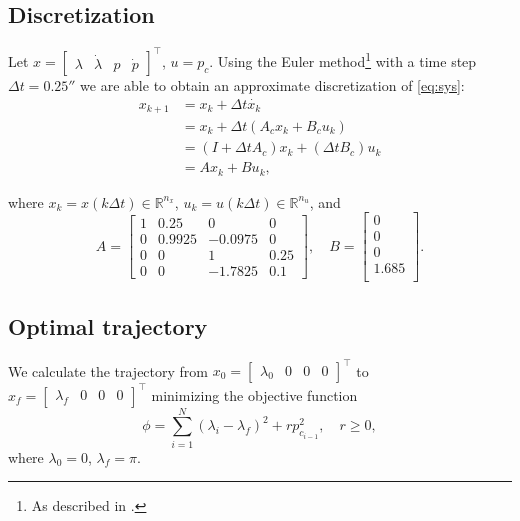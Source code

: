 \subsection{Discretization}
Let $x = \begin{bmatrix}\lambda&\dot{\lambda}&p&\dot{p}\end{bmatrix}^\top$, $u = p_c$. Using the Euler method\footnote{As described in \cite{Gravdahl2003}.} with a time step $\Delta t = 0.25\second$ we are able to obtain an approximate discretization of \eqref{eq:sys}:
\begin{align}
\label{eq:dmodel}
	x_{k+1} &= x_k + \Delta t \dot{x_k}\nonumber \\
			&= x_k + \Delta t (A_c x_k + B_c u_k)\nonumber\\
			&= (I + \Delta t A_c) x_k + (\Delta t B_c) u_k\nonumber \\
			&= A x_k + B u_k,
\end{align}

where $x_k = x(k\Delta t) \in \mathbb{R}^{n_x}$, $u_k = u(k\Delta t)\in \mathbb{R}^{n_u}$, and
\begin{equation*}
	A = 
	\begin{bmatrix}
		1 & 0.25 & 0 & 0 \\
		0 & 0.9925 & -0.0975 & 0 \\
		0 & 0 & 1 & 0.25 \\
		0 & 0 & -1.7825 & 0.1
	\end{bmatrix}, \quad
	B = 
	\begin{bmatrix}
		0 \\
		0 \\
		0 \\
		1.685 \\
	\end{bmatrix}.
\end{equation*}

\subsection{Optimal trajectory}

We calculate the trajectory from $x_0 = \begin{bmatrix}\lambda_0&0&0&0\end{bmatrix}^\top$ to $x_f = \begin{bmatrix}\lambda_f&0&0&0\end{bmatrix}^\top$ minimizing the objective function 
\begin{equation}
\label{eq:QC_p}
	\phi = \sum_{i=1}^{N}(\lambda_i - \lambda_f)^2 + rp^2_{c_{i-1}}, \quad r \ge 0,
\end{equation}
where $\lambda_0 = 0$, $\lambda_f = \pi$.

